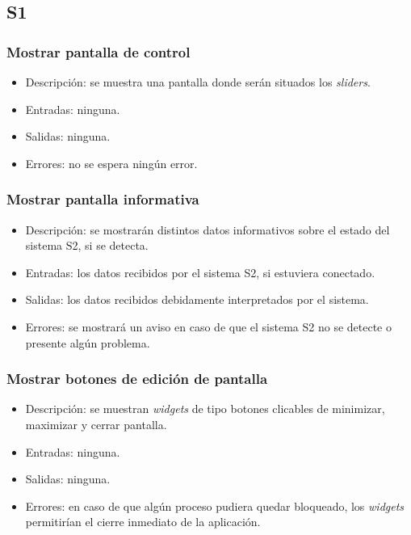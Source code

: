 \subsection*{\ac{S1}}
\subsubsection{Mostrar pantalla de control}
\begin{itemize}
    \item Descripción: se muestra una pantalla donde serán situados los \textit{sliders}.
    \item Entradas: ninguna.
    \item Salidas: ninguna.
    \item Errores: no se espera ningún error.
\end{itemize}

\subsubsection{Mostrar pantalla informativa}
\begin{itemize}
    \item Descripción: se mostrarán distintos datos informativos sobre el estado del sistema \ac{S2}, si se detecta.
    \item Entradas: los datos recibidos por el sistema \ac{S2}, si estuviera conectado.
    \item Salidas: los datos recibidos debidamente interpretados por el sistema.
    \item Errores: se mostrará un aviso en caso de que el sistema \ac{S2} no se detecte o presente algún problema.
\end{itemize}

\subsubsection{Mostrar botones de edición de pantalla}
\begin{itemize}
    \item Descripción: se muestran \textit{widgets} de tipo botones clicables de minimizar, maximizar y cerrar pantalla.
    \item Entradas: ninguna.
    \item Salidas: ninguna.
    \item Errores: en caso de que algún proceso pudiera quedar bloqueado, los \textit{widgets} permitirían el cierre inmediato de la aplicación.
\end{itemize}


